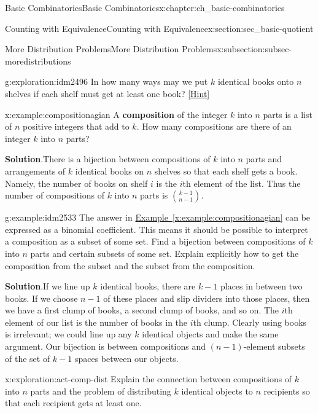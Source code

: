 \documentclass[oneside,10pt,]{book}
\newcommand{\terminology}[1]{\textbf{#1}}
\numberwithin{equation}{chapter}
\begin{document}
\begin{chapterptx}{Basic Combinatorics}{}{Basic Combinatorics}{}{}{x:chapter:ch_basic-combinatorics}
\begin{sectionptx}{Counting with Equivalence}{}{Counting with Equivalence}{}{}{x:section:sec_basic-quotient}
\begin{subsectionptx}{More Distribution Problems}{}{More Distribution Problems}{}{}{x:subsection:subsec-moredistributions}
\begin{exploration}{}{g:exploration:idm2496}%
In how many ways may we put \(k\) identical books onto \(n\) shelves if each shelf must get at least one book?%
\space\hspace*{0pt}\hfill{\tiny\hyperlink{g:hint:idm2501-back}{[Hint]}}\end{exploration}
\begin{example}{}{x:example:compositionagian}%
A \terminology{composition} of the integer \(k\) into \(n\) parts is a list of \(n\) positive integers that add to \(k\).  How many compositions are there of an integer \(k\) into \(n\) parts?%
\par\smallskip%
\noindent\textbf{Solution}.\hypertarget{g:solution:idm2522}{}\quad{}There is a bijection between compositions of \(k\) into \(n\) parts and arrangements of \(k\) identical books on \(n\) shelves so that each shelf gets a book. Namely, the number of books on shelf \(i\) is the \(i\)th element of the list. Thus the number of compositions of \(k\) into \(n\) parts is \(\binom{k-1}{n-1}\).%
\end{example}
\begin{example}{}{g:example:idm2533}%
The answer in \hyperref[x:example:compositionagian]{Example~\ref{x:example:compositionagian}} can be expressed as a binomial coefficient. This means it should be possible to interpret a composition as a subset of some set. Find a bijection between compositions of \(k\) into \(n\) parts and certain subsets of some set.  Explain explicitly how to get the composition from the subset and the subset from the composition.%
\par\smallskip%
\noindent\textbf{Solution}.\hypertarget{g:solution:idm2539}{}\quad{}If we line up \(k\) identical books, there are \(k-1\) places in between two books. If we choose \(n-1\) of these places and slip dividers into those places, then we have a first clump of books, a second clump of books, and so on. The \(i\)th element of our list is the number of books in the \(i\)th clump. Clearly using books is irrelevant; we could line up any \(k\) identical objects and make the same argument. Our bijection is between compositions and \((n-1)\)-element subsets of the set of \(k-1\) spaces between our objects.%
\end{example}
\begin{exploration}{}{x:exploration:act-comp-dist}%
Explain the connection between compositions of \(k\) into \(n\) parts and the problem of distributing \(k\) identical objects to \(n\) recipients so that each recipient gets at least one.%

\end{exploration}
\end{subsectionptx}
\end{sectionptx}
\end{chapterptx}
\end{document}
